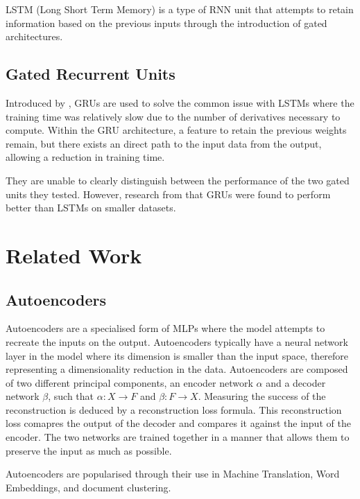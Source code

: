 \documentclass[12pt,twoside]{report}
\begin{document}
LSTM (Long Short Term Memory) is a type of RNN unit that attempts to retain information based on the previous inputs through the introduction of gated architectures.

\subsection{Gated Recurrent Units}

Introduced by \cite{cho_properties_2014}, GRUs are used to solve the common issue with LSTMs where the training time was relatively slow due to the number of derivatives necessary to compute. Within the GRU architecture, a feature to retain the previous weights remain, but there exists an direct path to the input data from the output, allowing a reduction in training time. 

They are unable to clearly distinguish between the performance of the two gated units they tested.
However, research from \cite{chung_empirical_2014} that GRUs were found to perform better than LSTMs on smaller datasets. 

\section{Related Work}


\subsection{Autoencoders}

Autoencoders are a specialised form of MLPs where the model attempts to recreate the inputs on the output. Autoencoders typically have a neural network layer in the model where its dimension is smaller than the input space, therefore representing a dimensionality reduction in the data. Autoencoders are composed of two different principal components, an encoder network $\alpha$ and a decoder network $\beta$, such that $\alpha : X \rightarrow F$ and $\beta : F \rightarrow X$. Measuring the success of the reconstruction is deduced by a reconstruction loss formula. This reconstruction loss comapres the output of the decoder and compares it against the input of the encoder. The two networks are trained together in a manner that allows them to preserve the input as much as possible.


Autoencoders are popularised through their use in Machine Translation, Word Embeddings, and document clustering.
\end{document}
